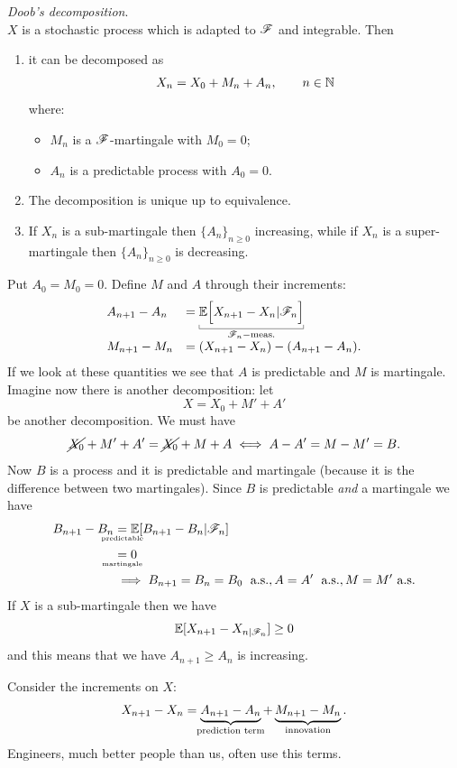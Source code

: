\documentclass{report}
\begin{document}
\begin{theorem}
	\emph{Doob's decomposition}.\\
	$X$ is a stochastic process which is adapted to $\mathscr{F}$ and integrable. Then
	\begin{enumerate}
		\item it can be decomposed as 
		\[X_{n}=X_{0}+M_{n}+A_{n},\qquad n\in\mathbb{N}\]
		where:
		\begin{itemize}
			\item $M_{n}$ is a $\mathscr{F}$-martingale with $M_0=0$;
			\item $A_{n}$ is a predictable process with $A_0=0$.
		\end{itemize}
		\item The decomposition is unique up to equivalence.
		\item If $X_{n}$ is a sub-martingale then ${\{A_{n}\}}_{n\geq0}$ increasing, while if $X_{n}$ is a super-martingale then ${\{A_{n}\}}_{n\geq0}$ is decreasing.
	\end{enumerate}
\end{theorem}
\begin{fancyproof}
	Put $A_0=M_0=0$. Define $M$ and $A$ through their increments:
	\[ \begin{array}{l l}
		A_{n+1}-A_{n}&=\underbracket[0.3pt]{\ev\Big[X_{n+1}-X_{n}|\F_{n}\Big]}_{\F_{n}-\text{meas.}}\\
		M_{n+1}-M_{n}&=(X_{n+1}-X_{n})-(A_{n+1}-A_{n}).
	\end{array} \]
	If we look at these quantities we see that $A$ is predictable and $M$ is martingale. Imagine now there is another decomposition: let
	\[X=X_0+M'+A'\]
	be another decomposition. We must have
	\[\cancel{X_0}+M'+A'=\cancel{X_0}+M+A\iff A-A'=M-M'=B.\]
	Now $B$ is a process and it is predictable and martingale (because it is the difference between two martingales). Since $B$ is predictable \textit{and} a martingale we have
\begin{align*}
			B_{n+1}-B_{n}&\underset{\mathclap{\text{\tiny predictable}}}{=}\ev[B_{n+1}-B_{n}|\F_{n}]\\
		&\underset{\mathclap{\text{\tiny martingale}}}{=}0\\
		&\implies B_{n+1}=B_{n}=B_0\;\as,A=A'\;\as,M=M'\as\\
\end{align*}
If $X$ is a sub-martingale then we have
\[\mathbb{E}[X_{n+1}-X_{n|\mathscr{F}_{n}}]\geq0\]
and this means that we have $A_{n+1}\geq A_{n}$ is increasing.
\end{fancyproof}
Consider the increments on $X$:
\[X_{n+1}-X_{n}=\underbrace{A_{n+1}-A_{n}}_{\mathclap{\text{prediction term}}}+\underbrace{M_{n+1}-M_{n}}_{\mathclap{\text{innovation}}}.\]
Engineers, much better people than us, often use this terms.
\end{document}
